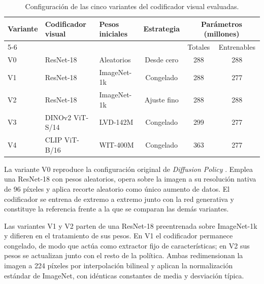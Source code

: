 \begin{table}[htbp]
  \centering
  \caption{Configuraci\'on de las cinco variantes del codificador visual evaluadas.}
  \label{tab:variantes}
  \small
  \begin{tabular}{lllcc c}
    \toprule
    Variante & Codificador visual & Pesos iniciales & Estrategia &
      \multicolumn{2}{c}{Par\'ametros (millones)} \\
    \cmidrule(lr){5-6}
     &  &  &  & Totales & Entrenables \\
    \midrule
    V0 & ResNet-18       & Aleatorios  & Desde cero  & \num{288} & \num{288} \\
    V1 & ResNet-18       & ImageNet-1k & Congelado   & \num{288} & \num{277} \\
    V2 & ResNet-18       & ImageNet-1k & Ajuste fino & \num{288} & \num{288} \\
    V3 & DINOv2 ViT-S/14 & LVD-142M    & Congelado   & \num{299} & \num{277} \\
    V4 & CLIP ViT-B/16   & WIT-400M    & Congelado   & \num{363} & \num{277} \\
    \bottomrule
  \end{tabular}
\end{table}


La variante V0 reproduce la configuraci\'on original de \textit{Diffusion Policy}
\cite{chi2025diffusion}. Emplea una ResNet-18 con pesos aleatorios, opera sobre la imagen
a su resoluci\'on nativa de \num{96} p\'ixeles y aplica recorte aleatorio como \'unico
aumento de datos. El codificador se entrena de extremo a extremo junto con la red
generativa y constituye la referencia frente a la que se comparan las dem\'as variantes.


Las variantes V1 y V2 parten de una ResNet-18 preentrenada sobre ImageNet-1k
\cite{deng2009imagenet} y difieren en el tratamiento de sus pesos. En V1 el codificador
permanece congelado, de modo que act\'ua como extractor fijo de caracter\'isticas; en V2
sus pesos se actualizan junto con el resto de la pol\'itica. Ambas redimensionan la imagen
a \num{224} p\'ixeles por interpolaci\'on bilineal y aplican la normalizaci\'on est\'andar
de ImageNet, con id\'enticas constantes de media y desviaci\'on t\'ipica.

